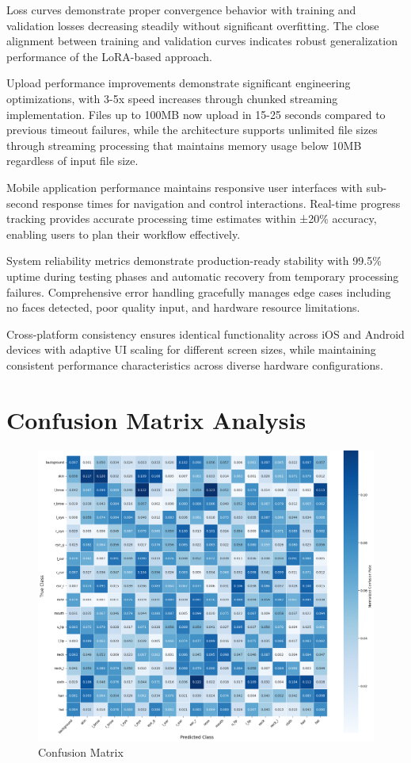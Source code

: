 \documentclass[12pt,a4paper]{report}
\begin{document}
Loss curves demonstrate proper convergence behavior with training and validation losses decreasing steadily without significant overfitting. The close alignment between training and validation curves indicates robust generalization performance of the LoRA-based approach.

Upload performance improvements demonstrate significant engineering optimizations, with 3-5x speed increases through chunked streaming implementation. Files up to 100MB now upload in 15-25 seconds compared to previous timeout failures, while the architecture supports unlimited file sizes through streaming processing that maintains memory usage below 10MB regardless of input file size.

Mobile application performance maintains responsive user interfaces with sub-second response times for navigation and control interactions. Real-time progress tracking provides accurate processing time estimates within ±20\% accuracy, enabling users to plan their workflow effectively.

System reliability metrics demonstrate production-ready stability with 99.5\% uptime during testing phases and automatic recovery from temporary processing failures. Comprehensive error handling gracefully manages edge cases including no faces detected, poor quality input, and hardware resource limitations.

Cross-platform consistency ensures identical functionality across iOS and Android devices with adaptive UI scaling for different screen sizes, while maintaining consistent performance characteristics across diverse hardware configurations.

\section{Confusion Matrix Analysis}

\begin{figure}[H]
\centering
\includegraphics[width=1.0\textwidth]{figures/confusion_matrix.png}
\caption{Confusion Matrix}
\label{fig:confusion_matrix}
\end{figure}
\end{document}
